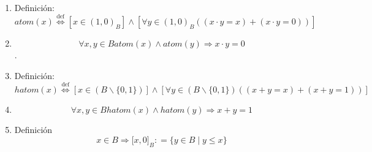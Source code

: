 \begin{enumerate}
\begin{enumerate}
\begin{enumerate}
\begin{enumerate}
        \begin{enumerate}
        \def\labelenumv{\arabic{enumv}.}
        \tightlist
        \item
          \[x,{y \in B}{{x \geq {y \land y}} \geq x}\]
        \item
          \[x,{y \in B}{{{x + y} = {{y \land x} + y}} = x}\]
        \item
          \[x,{y \in B}{x = y}\]
        \end{enumerate}
      \item
        Transitiva:
        \[\forall x,y,{z \in B}{{x \geq {y \land y}} \geq z}\Rightarrow{x \geq z}\]

        \begin{enumerate}
        \def\labelenumv{\arabic{enumv}.}
        \tightlist
        \item
          \[{x \geq {y \land y}} \geq z\]
        \item
          \[{{x + y} = {{x \land y} + z}} = y\]
        \item
          \[{{x + y} + z} = {x + z}\]
        \item
          \[{x + y} = {x + z}\]
        \item
          \[x = {x + z}\]
        \item
          \[x \geq z\]
        \end{enumerate}
      \end{enumerate}
    \item
      Definición:\[\mathit{atom}{(x)}\overset{\text{def}}{\Leftrightarrow}{\left\lbrack {x \in (1,0)_{B}} \right\rbrack \land \left\lbrack {\forall{y \in (1,0)_{B}}\left( {\left( {{x \cdot y} = x} \right) + \left( {{x \cdot y} = 0} \right)} \right)} \right\rbrack}\]
    \item
      \[\forall x,{y \in B}\mathit{atom}{{(x)} \land \mathit{atom}}{(y)}\Rightarrow{{x \cdot y} = 0}\].
    \item
      Definición:\[\mathit{hatom}{(x)}\overset{\text{def}}{\Leftrightarrow}{\left\lbrack {x \in \left( {B \smallsetminus {\{ 0,1\}}} \right)} \right\rbrack \land \left\lbrack {\forall{y \in \left( {B \smallsetminus {\{ 0,1\}}} \right)}\left( {\left( {{x + y} = x} \right) + \left( {{x + y} = 1} \right)} \right)} \right\rbrack}\]
    \item
      \[\forall x,{y \in B}\mathit{hatom}{{(x)} \land \mathit{hatom}}{(y)}\Rightarrow{{x + y} = 1}\]
    \item
      Definición\[{x \in B}\Rightarrow{\lbrack{x,0}\rbrack}_{B}{: = {\{{{y \in B} \mid {y \leq x}}\}}}\]

\end{enumerate}
\end{enumerate}
\end{enumerate}
